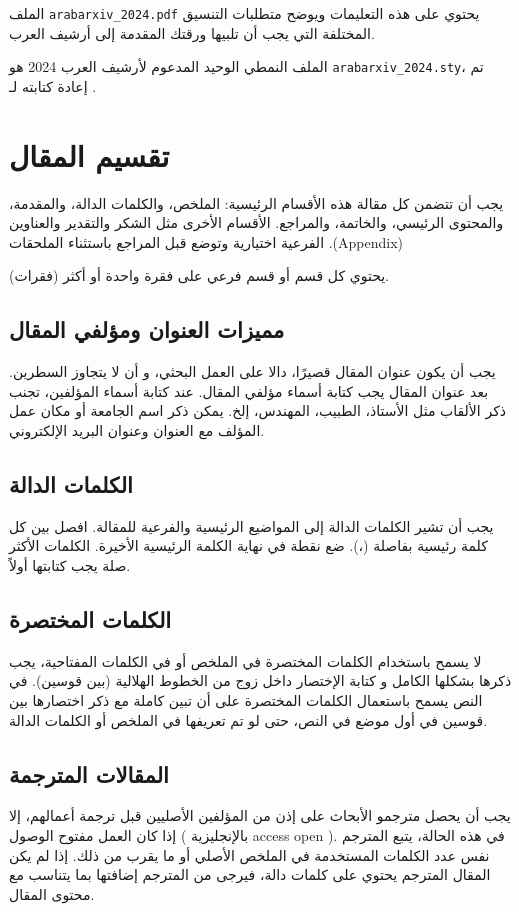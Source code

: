 \documentclass[12pt]{article}
\begin{document}
الملف \verb+arabarxiv_2024.pdf+ يحتوي على هذه التعليمات ويوضح متطلبات التنسيق المختلفة التي يجب أن تلبيها ورقتك المقدمة إلى أرشيف العرب.


الملف النمطي \XeLaTeX{} الوحيد المدعوم لأرشيف العرب 2024 هو \verb+arabarxiv_2024.sty+، تم إعادة كتابته لـ \XeLaTeX{}.

\section{تقسيم المقال}
يجب أن تتضمن كل مقالة هذه الأقسام الرئيسية: الملخص، والكلمات الدالة، والمقدمة، والمحتوى الرئيسي، والخاتمة، والمراجع. الأقسام الأخرى مثل الشكر والتقدير والعناوين الفرعية اختيارية وتوضع قبل المراجع باستثناء الملحقات .(Appendix)

يحتوي كل قسم أو قسم فرعي على فقرة واحدة أو أكثر (فقرات).

\subsection{مميزات العنوان ومؤلفي المقال}
يجب أن يكون عنوان المقال قصيرًا، دالا على العمل البحثي، و أن لا يتجاوز السطرين.
بعد عنوان المقال يجب كتابة أسماء مؤلفي المقال. عند كتابة أسماء المؤلفين، تجنب ذكر الألقاب مثل الأستاذ، الطبيب، المهندس، إلخ. يمكن ذكر اسم الجامعة أو مكان عمل المؤلف مع العنوان وعنوان البريد الإلكتروني.

\subsection{الكلمات الدالة}
يجب أن تشير الكلمات الدالة إلى المواضيع الرئيسية والفرعية للمقالة. افصل بين كل كلمة رئيسية بفاصلة (،). ضع نقطة في نهاية الكلمة الرئيسية الأخيرة. الكلمات الأكثر صلة يجب كتابتها أولاً.

\subsection{الكلمات المختصرة}
لا يسمح باستخدام الكلمات المختصرة في الملخص أو في الكلمات المفتاحية، يجب ذكرها بشكلها الكامل و  كتابة الإختصار داخل زوج من الخطوط الهلالية (بين قوسين).
في النص يسمح باستعمال  الكلمات المختصرة على أن تبين كاملة مع ذكر اختصارها بين قوسين في أول موضع في النص، حتى لو تم تعريفها في الملخص أو الكلمات الدالة.

\subsection{المقالات المترجمة}
 يجب أن يحصل مترجمو الأبحاث على إذن من المؤلفين الأصليين قبل 
 ترجمة أعمالهم، إلا إذا كان العمل مفتوح الوصول ( بالإنجليزية access open ).
 في هذه الحالة، يتبع المترجم نفس عدد الكلمات المستخدمة في الملخص الأصلي أو ما يقرب من ذلك.
 إذا لم يكن المقال المترجم يحتوي على كلمات دالة،  فيرجى من المترجم إضافتها بما يتناسب مع محتوى المقال. 
 
\end{document}
